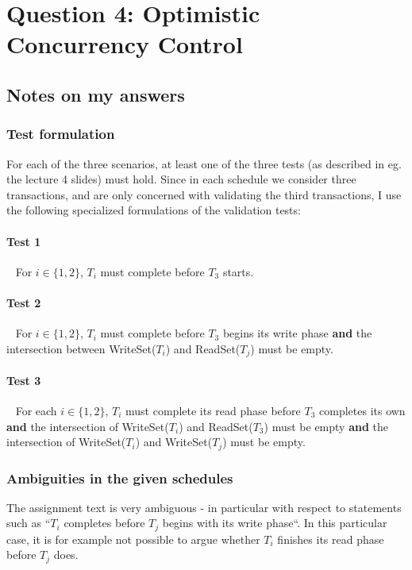 \newpage
\section{Question 4: Optimistic Concurrency Control}

\subsection{Notes on my answers}

\subsubsection{Test formulation}

For each of the three scenarios, at least one of the three tests (as described
in eg. the lecture 4 slides) must hold. Since in each schedule we consider three
transactions, and are only concerned with validating the third transactions, I
use the following specialized formulations of the validation tests:

\paragraph{Test 1}~\smallskip
For $i \in \{1, 2\}$, $T_i$ must complete before $T_3$ starts.

\paragraph{Test 2}~\smallskip
For $i \in \{1, 2\}$, $T_i$ must complete before $T_3$ begins its write phase
\textbf{and} the intersection between WriteSet($T_i$) and ReadSet($T_j$) must be
empty.

\paragraph{Test 3}~\smallskip
For each $i \in \{1, 2\}$, $T_i$ must complete its read phase before $T_3$
completes its own \textbf{and} the intersection of WriteSet($T_i$) and
ReadSet($T_3$) must be empty \textbf{and} the intersection of WriteSet($T_i$)
and WriteSet($T_j$) must be empty.

\subsubsection{Ambiguities in the given schedules}

The assignment text is very ambiguous - in particular with respect to statements
such as ``$T_i$ completes before $T_j$ begins with its write phase``. In this particular
case, it is for example not possible to argue whether $T_i$ finishes its read
phase before $T_j$ does.

